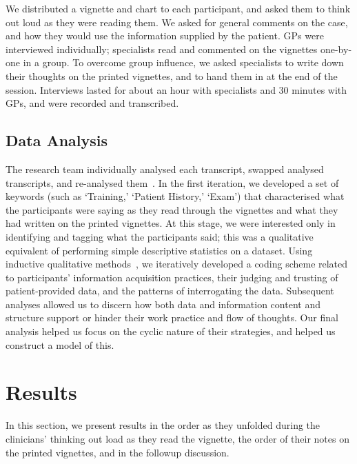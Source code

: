 \documentclass{sigchi}
\begin{document}
We distributed a vignette and chart to each participant, and asked them to think out loud as they were reading them.  We asked for general comments on the case, and how they would use the information supplied by the patient.  GPs were interviewed individually; specialists read and commented on the vignettes one-by-one in a group.  To overcome group influence, we asked specialists to write down their thoughts on the printed vignettes, and to hand them in at the end of the session.  Interviews lasted for about an hour with specialists and 30 minutes with GPs, and were recorded and transcribed.

\subsection{Data Analysis}
The research team individually analysed each transcript, swapped analysed transcripts, and re-analysed them~\cite{pope2000qualitative}.  In the first iteration, we developed a set of keywords (such as `Training,' `Patient History,' `Exam') that characterised what the participants were saying as they read through the vignettes and what they had written on the printed vignettes. At this stage, we were interested only in identifying and tagging what the participants said; this was a qualitative equivalent of performing simple descriptive statistics on a dataset.  Using inductive qualitative methods~\cite{corbin2014basics}, we iteratively developed a coding scheme related to participants' information acquisition practices, their judging and trusting of patient-provided data, and the patterns of interrogating the data. Subsequent analyses allowed us to discern how both data and information content and structure support or hinder their work practice and flow of thoughts.  Our final analysis helped us focus on the cyclic nature of their strategies, and helped us construct a model of this.


\section{Results}

\newcommand{\bigquote}[2]{
    \begin{quote}
        #1~--~\textit{#2}
    \end{quote}
}

In this section, we present results in the order as they unfolded during the clinicians' thinking out load as they read the vignette, the order of their notes on the printed vignettes, and in the followup discussion.
    
\end{document}
